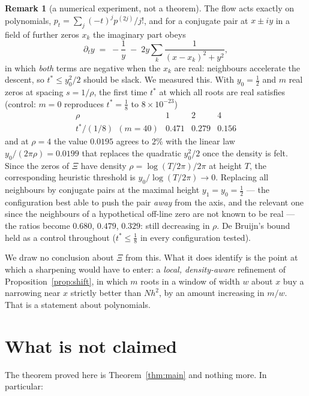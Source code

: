 \documentclass[11pt]{article}
\theoremstyle{definition}
\newtheorem{remark}[theorem]{Remark}
\begin{document}
\begin{remark}[a numerical experiment, not a theorem]\label{rem:density}
The flow acts exactly on polynomials, $p_t=\sum_j(-t)^{j}p^{(2j)}/j!$, and for a conjugate pair at
$x\pm iy$ in a field of further zeros $x_k$ the imaginary part obeys
\[
  \partial_t y \;=\; -\frac1y \;-\; 2y\sum_k\frac1{(x-x_k)^{2}+y^{2}} ,
\]
in which \emph{both} terms are negative when the $x_k$ are real: neighbours accelerate the descent, so
$t^{*}\le y_0^{2}/2$ should be slack.  We measured this.  With $y_0=\tfrac12$ and $m$ real zeros at
spacing $s=1/\rho$, the first time $t^{*}$ at which all roots are real satisfies (control: $m=0$
reproduces $t^{*}=\tfrac18$ to $8\times10^{-23}$)
\[
  \begin{array}{c|ccc}
    \rho & 1 & 2 & 4\\\hline
    t^{*}/(1/8)\ \ (m=40) & 0.471 & 0.279 & 0.156
  \end{array}
\]
and at $\rho=4$ the value $0.0195$ agrees to $2\%$ with the linear law $y_0/(2\pi\rho)=0.0199$ that
replaces the quadratic $y_0^{2}/2$ once the density is felt.  Since the zeros of $\Xi$ have density
$\rho=\log(T/2\pi)/2\pi$ at height $T$, the corresponding heuristic threshold is
$y_0/\log(T/2\pi)\to0$.  Replacing all neighbours by conjugate pairs at the maximal height
$y_1=y_0=\tfrac12$ --- the configuration best able to push the pair \emph{away} from the axis, and the
relevant one since the neighbours of a hypothetical off-line zero are not known to be real --- the
ratios become $0.680$, $0.479$, $0.329$: still decreasing in $\rho$.  De Bruijn's bound held as a
control throughout ($t^{*}\le\tfrac18$ in every configuration tested).

We draw no conclusion about $\Xi$ from this.  What it does identify is the point at which a
sharpening would have to enter: a \emph{local, density-aware} refinement of
Proposition~\ref{prop:shift}, in which $m$ roots in a window of width $w$ about $x$ buy a narrowing
near $x$ strictly better than $Nh^{2}$, by an amount increasing in $m/w$.  That is a statement about
polynomials.
\end{remark}

\section{What is not claimed}

The theorem proved here is Theorem~\ref{thm:main} and nothing more.  In particular:
\end{document}
